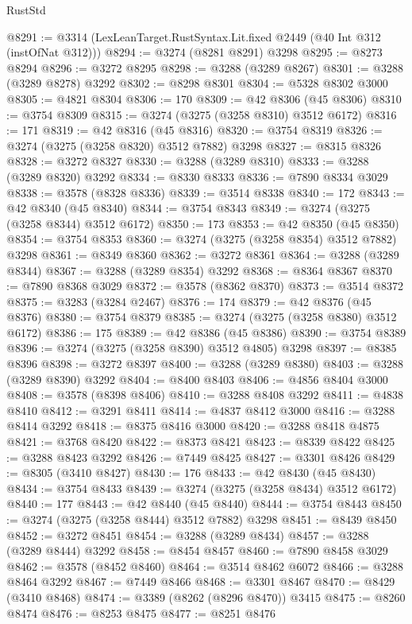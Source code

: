 \begin{lexlean}{RustStd}
\begin{coremodule}
@8291 := @3314 (LexLeanTarget.RustSyntax.Lit.fixed @2449 (@40 Int @312 (instOfNat @312)))
@8294 := @3274 (@8281 @8291) @3298
@8295 := @8273 @8294
@8296 := @3272 @8295
@8298 := @3288 (@3289 @8267)
@8301 := @3288 (@3289 @8278) @3292
@8302 := @8298 @8301
@8304 := @5328 @8302 @3000
@8305 := @4821 @8304
@8306 := 170
@8309 := @42 @8306 (@45 @8306)
@8310 := @3754 @8309
@8315 := @3274 (@3275 (@3258 @8310) @3512 @6172)
@8316 := 171
@8319 := @42 @8316 (@45 @8316)
@8320 := @3754 @8319
@8326 := @3274 (@3275 (@3258 @8320) @3512 @7882) @3298
@8327 := @8315 @8326
@8328 := @3272 @8327
@8330 := @3288 (@3289 @8310)
@8333 := @3288 (@3289 @8320) @3292
@8334 := @8330 @8333
@8336 := @7890 @8334 @3029
@8338 := @3578 (@8328 @8336)
@8339 := @3514 @8338
@8340 := 172
@8343 := @42 @8340 (@45 @8340)
@8344 := @3754 @8343
@8349 := @3274 (@3275 (@3258 @8344) @3512 @6172)
@8350 := 173
@8353 := @42 @8350 (@45 @8350)
@8354 := @3754 @8353
@8360 := @3274 (@3275 (@3258 @8354) @3512 @7882) @3298
@8361 := @8349 @8360
@8362 := @3272 @8361
@8364 := @3288 (@3289 @8344)
@8367 := @3288 (@3289 @8354) @3292
@8368 := @8364 @8367
@8370 := @7890 @8368 @3029
@8372 := @3578 (@8362 @8370)
@8373 := @3514 @8372
@8375 := @3283 (@3284 @2467)
@8376 := 174
@8379 := @42 @8376 (@45 @8376)
@8380 := @3754 @8379
@8385 := @3274 (@3275 (@3258 @8380) @3512 @6172)
@8386 := 175
@8389 := @42 @8386 (@45 @8386)
@8390 := @3754 @8389
@8396 := @3274 (@3275 (@3258 @8390) @3512 @4805) @3298
@8397 := @8385 @8396
@8398 := @3272 @8397
@8400 := @3288 (@3289 @8380)
@8403 := @3288 (@3289 @8390) @3292
@8404 := @8400 @8403
@8406 := @4856 @8404 @3000
@8408 := @3578 (@8398 @8406)
@8410 := @3288 @8408 @3292
@8411 := @4838 @8410
@8412 := @3291 @8411
@8414 := @4837 @8412 @3000
@8416 := @3288 @8414 @3292
@8418 := @8375 @8416 @3000
@8420 := @3288 @8418 @4875
@8421 := @3768 @8420
@8422 := @8373 @8421
@8423 := @8339 @8422
@8425 := @3288 @8423 @3292
@8426 := @7449 @8425
@8427 := @3301 @8426
@8429 := @8305 (@3410 @8427)
@8430 := 176
@8433 := @42 @8430 (@45 @8430)
@8434 := @3754 @8433
@8439 := @3274 (@3275 (@3258 @8434) @3512 @6172)
@8440 := 177
@8443 := @42 @8440 (@45 @8440)
@8444 := @3754 @8443
@8450 := @3274 (@3275 (@3258 @8444) @3512 @7882) @3298
@8451 := @8439 @8450
@8452 := @3272 @8451
@8454 := @3288 (@3289 @8434)
@8457 := @3288 (@3289 @8444) @3292
@8458 := @8454 @8457
@8460 := @7890 @8458 @3029
@8462 := @3578 (@8452 @8460)
@8464 := @3514 @8462 @6072
@8466 := @3288 @8464 @3292
@8467 := @7449 @8466
@8468 := @3301 @8467
@8470 := @8429 (@3410 @8468)
@8474 := @3389 (@8262 (@8296 @8470)) @3415
@8475 := @8260 @8474
@8476 := @8253 @8475
@8477 := @8251 @8476

\end{coremodule}
\end{lexlean}
